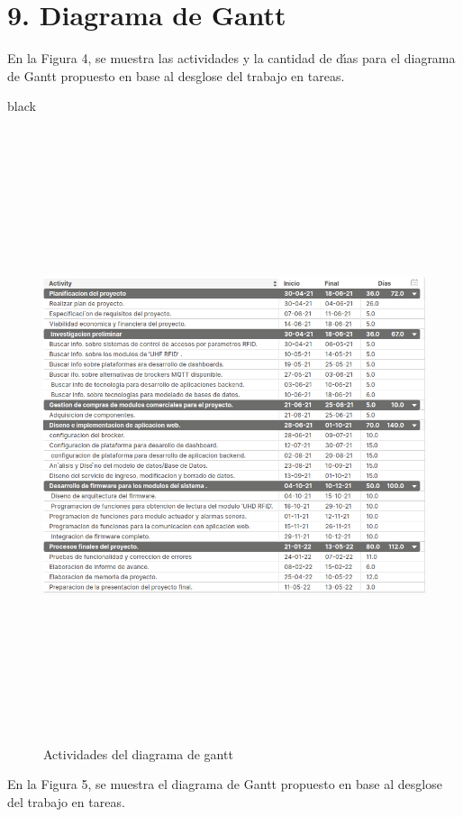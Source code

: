 \documentclass[
11pt, %
codirector, %
]{charter}
\begin{document}
\section{9. Diagrama de Gantt}
\label{sec:gantt}
En la Figura 4, se muestra las actividades y la cantidad de dı́as para el diagrama de Gantt
propuesto en base al desglose del trabajo en tareas.
\begin{consigna}{black}
\begin{figure}[htpb]
\centering 
\includegraphics[width=16cm, height=18cm]{./Figuras/Listadiagramadegant.png}
\caption{Actividades del diagrama de gantt}
\label{fig:AoN}
\end{figure}


En la Figura 5, se muestra el diagrama de Gantt propuesto en base al desglose del trabajo en
tareas.


\end{consigna}
\end{document}
